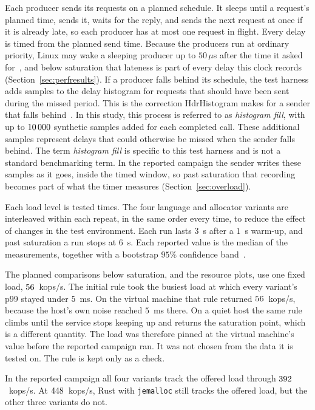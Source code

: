 \documentclass[english,oneside,a4paper,censored,csm,software-track-2020]{HYthesisML}
\begin{document}
Each producer sends its requests on a planned schedule. It sleeps until a
request's planned time, sends it, waits for the reply, and sends the next request
at once if it is already late, so each producer has at most one request in
flight. Every delay is timed from the planned send time. Because the producers
run at ordinary priority, Linux may wake a sleeping producer up to $50\,\mu$s
after the time it asked for~\cite{linux2026timerslack}, and below saturation that
lateness is part of every delay this clock records (Section~\ref{sec:perfresults}).
If a producer falls behind its schedule, the test harness adds samples to
the delay histogram for requests that should have been sent during the missed
period. This is the correction HdrHistogram makes for a sender that falls
behind~\cite{schroeder2006openclosed,tene_hdrhistogram}. In this study,
this process is referred to as \emph{histogram fill}, with up to
$10\,000$ synthetic samples added for each completed call. These
additional samples represent delays that could otherwise be missed when the
sender falls behind. The term \emph{histogram fill} is specific to this test
harness and is not a standard benchmarking term. In the reported campaign the
sender writes these samples as it goes, inside the timed window, so past
saturation that recording becomes part of what the timer measures
(Section~\ref{sec:overload}).

Each load level is tested \NRepeats{} times. The four language and allocator
variants are interleaved within each repeat, in the same order every time, to
reduce the effect of changes in the test environment. Each run lasts $3$~s after
a $1$~s warm-up, and past saturation a run stops at $6$~s. Each reported value is the median of the measurements,
together with a bootstrap $95\%$ confidence
band~\cite{georges2007rigorous,efron1993bootstrap}.

The planned comparisons below saturation, and the resource plots, use one fixed
load, $56$~kops/s. The initial rule took the busiest load at which every
variant's p99 stayed under $5$~ms. On the virtual machine that rule returned
$56$~kops/s, because the host's own noise reached $5$~ms there.
On a quiet host the same rule climbs until the service stops keeping up and
returns the saturation point, which is a different quantity. The load was
therefore pinned at the virtual machine's value before the reported campaign
ran. It was not chosen from the data it is tested on. The rule is kept only as
a check.

In the reported campaign all four variants track the offered load through
$392$~kops/s. At
$448$~kops/s, Rust with \texttt{jemalloc} still tracks the offered
load, but the other three variants do not.
\end{document}
